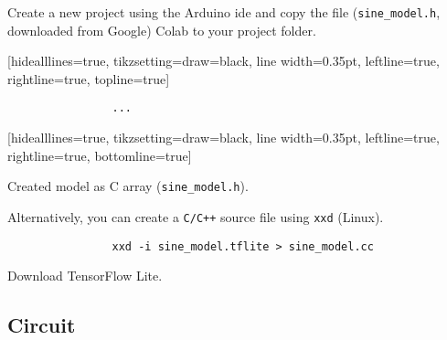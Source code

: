 \documentclass[aspectratio=169]{beamer}
\begin{document}
\begin{frame}[fragile]
    \par Create a new project using the Arduino\textregistered{} \acs{ide} and copy the file (\texttt{sine\_model.h}, downloaded from Google) Colab to your project folder.
    \begin{listing}[H]
        [hidealllines=true, tikzsetting={draw=black, line width=0.35pt}, leftline=true, rightline=true, topline=true]
        \vspace{-1.25em}
        \begin{mdframed}[hidealllines=true, tikzsetting={draw=black, line width=0.35pt}, leftline=true, rightline=true]
            \begin{verbatim}
                ...
            \end{verbatim}
        \end{mdframed}
        \vspace{-1.25em}
        [hidealllines=true, tikzsetting={draw=black, line width=0.35pt}, leftline=true, rightline=true, bottomline=true]
        \caption{Created model as C array (\texttt{sine\_model.h}).}
        \label{lst:tflite:sinewave:model:c_array}
    \end{listing}
    \par Alternatively, you can create a \texttt{C/C++} source file using \texttt{xxd} (Linux).
    \begin{listing}[H]
        \begin{mdframed}
            \begin{verbatim}
                xxd -i sine_model.tflite > sine_model.cc
            \end{verbatim}
        \end{mdframed}
        \caption{Download TensorFlow Lite.}
        \label{lst:tflite:sinewave:model:conversion}
    \end{listing}
\end{frame}

\subsection{Circuit}
\end{document}
